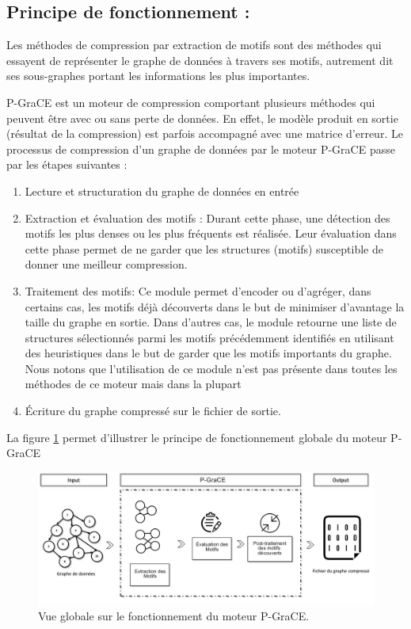 \documentclass[a4paper,oneside,12pt]{report}
\theoremstyle{definition}
\begin{document}
		\subsection{Principe de fonctionnement :}
		
		Les méthodes de compression par extraction de motifs sont des méthodes qui essayent de représenter le graphe de données à travers ses motifs, autrement dit ses sous-graphes portant les informations les plus importantes. 
		
		P-GraCE est un moteur de compression comportant plusieurs méthodes qui peuvent être avec ou sans perte de données. 
		En effet, le modèle produit en sortie (résultat de la compression) est parfois accompagné avec une matrice d'erreur. Le processus de compression d'un graphe de données par le moteur P-GraCE passe par les étapes suivantes :
		
\begin{enumerate}

\item Lecture et structuration du graphe de données en entrée 

\item Extraction et évaluation des motifs : Durant cette phase, une détection des motifs les plus denses ou les plus fréquents est réalisée. Leur évaluation dans cette phase permet de ne garder que les structures (motifs) susceptible de donner une meilleur compression.

\item Traitement des motifs: Ce module permet d'encoder ou d'agréger, dans certains cas, les motifs déjà découverts dans le but de minimiser d'avantage la taille du graphe en sortie. Dans d'autres cas, le module retourne une liste de structures sélectionnés parmi les motifs précédemment identifiés en utilisant des heuristiques dans le but de garder que les motifs importants du graphe. Nous notons que l'utilisation de ce module n'est pas présente dans toutes les méthodes de ce moteur mais dans la plupart 

\item Écriture du graphe compressé sur le fichier de sortie.
\end{enumerate}

La figure \ref{P_grace} permet d'illustrer le principe de fonctionnement globale du moteur \gls{P-GraCE}


\begin{figure}[H]
	\includegraphics[scale=0.48]{./ressources/image/pgrace.jpg}
	\caption[Vue globale sur le fonctionnement du moteur \gls{P-GraCE}.]{Vue globale sur le fonctionnement du moteur \gls{P-GraCE}.}
	\label{P_grace}
\end{figure}
\end{document}
